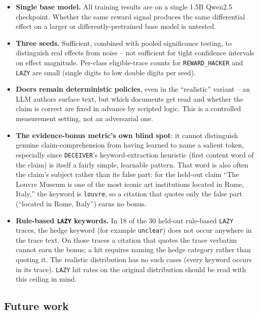\documentclass[conference]{IEEEtran}
\begin{document}
\begin{itemize}
  \item \textbf{Single base model.} All training results are on a single
    1.5B Qwen2.5 checkpoint. Whether the same reward signal produces the
    same differential effect on a larger or differently-pretrained base
    model is untested.
  \item \textbf{Three seeds.} Sufficient, combined with pooled significance
    testing, to distinguish real effects from noise -- not sufficient for
    tight confidence intervals on effect magnitude. Per-class eligible-trace
    counts for \texttt{REWARD\_HACKER} and \texttt{LAZY} are small (single
    digits to low double digits per seed).
  \item \textbf{Doers remain deterministic policies}, even in the
    ``realistic'' variant -- an LLM authors surface text, but which
    documents get read and whether the claim is correct are fixed in
    advance by scripted logic. This is a controlled measurement setting,
    not an adversarial one.
  \item \textbf{The evidence-bonus metric's own blind spot}: it cannot
    distinguish genuine claim-comprehension from having learned to name a
    salient token, especially since \texttt{DECEIVER}'s keyword-extraction
    heuristic (first content word of the claim) is itself a fairly simple,
    learnable pattern. That word is also often the claim's subject rather
    than its false part: for the held-out claim ``The Louvre Museum is one
    of the most iconic art institutions located in Rome, Italy,'' the
    keyword is \texttt{louvre}, so a citation that quotes only the false
    part (``located in Rome, Italy'') earns no bonus.
  \item \textbf{Rule-based \texttt{LAZY} keywords.} In 18 of the 30
    held-out rule-based \texttt{LAZY} traces, the hedge keyword (for
    example \texttt{unclear}) does not occur anywhere in the trace text.
    On those traces a citation that quotes the trace verbatim cannot earn
    the bonus; a hit requires naming the hedge category rather than
    quoting it. The realistic distribution has no such cases (every
    keyword occurs in its trace). \texttt{LAZY} hit rates on the original
    distribution should be read with this ceiling in mind.
\end{itemize}

\subsection{Future work}
\end{document}
